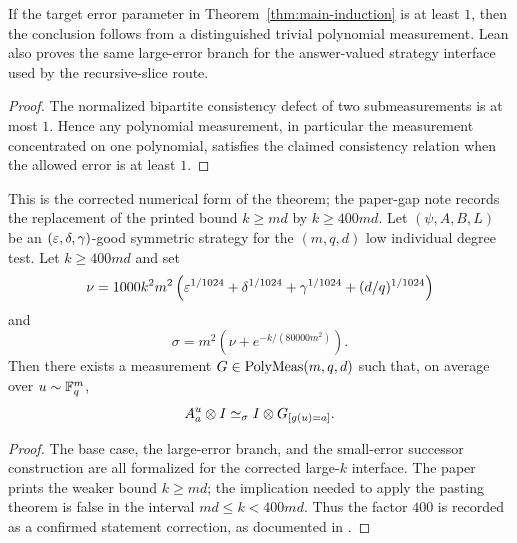 \begin{lemma}\label{lem:main-induction-large-error}
	\leanok
	If the target error parameter in Theorem~\ref{thm:main-induction} is at least
	\(1\), then the conclusion follows from a distinguished trivial polynomial
	measurement.  Lean also proves the same large-error branch for the
	answer-valued strategy interface used by the recursive-slice route.
\end{lemma}
\begin{proof}
	\leanok
	The normalized bipartite consistency defect of two submeasurements is at most
	\(1\).  Hence any polynomial measurement, in particular the measurement
	concentrated on one polynomial, satisfies the claimed consistency relation when
	the allowed error is at least \(1\).
\end{proof}

\begin{theorem}\label{thm:main-induction}
	\leanok
	This is the corrected numerical form of the theorem; the paper-gap note
	\cite{gap:issue-906-main-formal-k-bound} records the
	replacement of the printed bound \(k \ge md\) by \(k \ge 400md\).
  Let $(\psi,A,B,L)$ be an $(\varepsilon,\delta,\gamma)$-good symmetric strategy for the $(m,q,d)$ low individual degree test. Let $k \ge 400md$ and set
  \[
    \nu = 1000k^2m^2\left(\varepsilon^{1/1024}+\delta^{1/1024}+\gamma^{1/1024}+(d/q)^{1/1024}\right)
  \]
  and
  \[
    \sigma = m^2\left(\nu + e^{-k/(80000m^2)}\right).
  \]
  Then there exists a measurement $G \in \mathrm{PolyMeas}(m,q,d)$ such that, on average over $u \sim \mathbb{F}_q^m$,
  \[
    A_a^u \otimes I \simeq_\sigma I \otimes G_{[g(u)=a]}.
  \]
\end{theorem}
\begin{proof}
	\leanok
	The base case, the large-error branch, and the small-error successor
	construction are all formalized for the corrected large-\(k\) interface.
	The paper prints the weaker bound \(k\ge md\); the implication needed to
	apply the pasting theorem is false in the interval \(md\le k<400md\).
	Thus the factor \(400\) is recorded as a confirmed statement correction, as
	documented in \cite{gap:issue-906-main-formal-k-bound}.
\end{proof}

